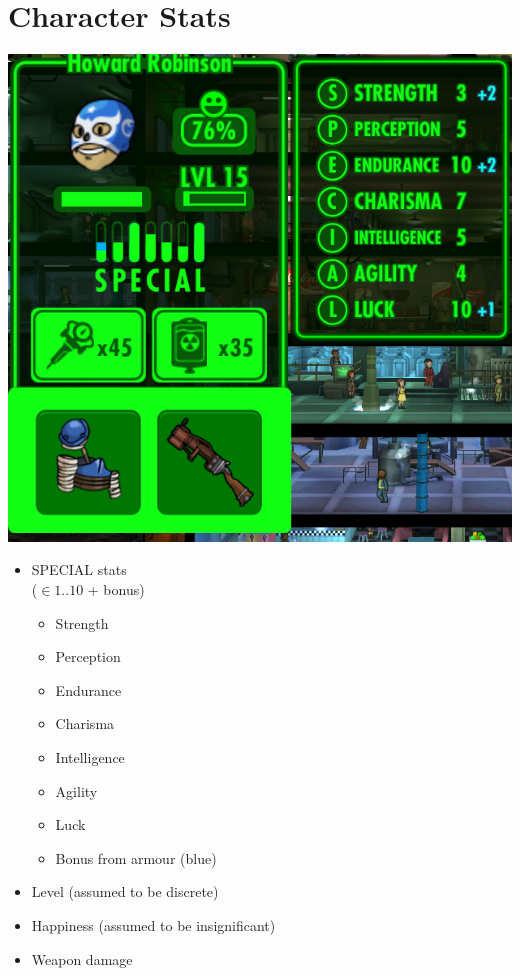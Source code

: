 \documentclass{beamer}
\begin{document}
\section{Character Stats}
\begin{frame}
  \begin{minipage}{.45\textwidth}
  \includegraphics[width=\textwidth]{stats}
  \end{minipage}
  \hfill
  \begin{minipage}{.45\textwidth}
  \begin{itemize}
  \item SPECIAL stats\\($\in 1..10$ + bonus)
  \begin{itemize}
  \item Strength
  \item Perception 
  \item Endurance 
  \item Charisma 
  \item Intelligence 
  \item Agility 
  \item Luck
  \item Bonus from armour (blue)
  \end{itemize}
  \item Level (assumed to be discrete)
  \item Happiness (assumed to be insignificant)
  \item Weapon damage
  \end{itemize}
  \end{minipage}
\end{frame}
\end{document}
